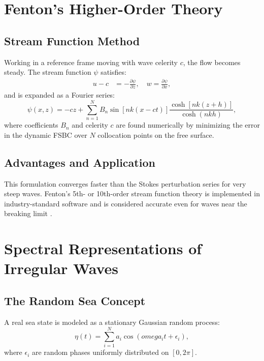 \documentclass[journal,10pt,twocolumn]{IEEEtran}
\def\omega{omega}%
\begin{document}
\section{Fenton's Higher-Order Theory}
\label{sec:fenton}

\subsection{Stream Function Method}
Working in a reference frame moving with wave celerity $c$, the flow becomes steady.
The stream function $\psi$ satisfies:
\begin{align}
  u - c &= -\frac{\partial\psi}{\partial z}, \quad
  w      = \frac{\partial\psi}{\partial x},
\end{align}
and is expanded as a Fourier series:
\begin{equation}
  \psi(x,z) = -cz + \sum_{n=1}^{N} B_n \sin[nk(x-ct)]
    \frac{\cosh[nk(z+h)]}{\cosh(nkh)},
\end{equation}
where coefficients $B_n$ and celerity $c$ are found numerically by minimizing the
error in the dynamic FSBC over $N$ collocation points on the free surface.

\subsection{Advantages and Application}
This formulation converges faster than the Stokes perturbation series for very steep
waves.
Fenton's 5th- or 10th-order stream function theory is implemented in industry-standard
software and is considered accurate even for waves near the breaking limit
\cite{Fenton1990,DNVC205}.

\section{Spectral Representations of Irregular Waves}
\label{sec:spectral}

\subsection{The Random Sea Concept}
A real sea state is modeled as a stationary Gaussian random process:
\begin{equation}
  \eta(t) = \sum_{i=1}^{N} a_i\cos(\omega_i t + \epsilon_i),
\end{equation}
where $\epsilon_i$ are random phases uniformly distributed on $[0,2\pi]$.
\end{document}
